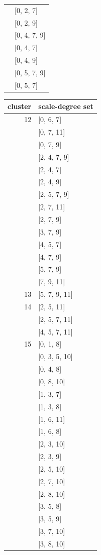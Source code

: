 \begin{table}
\begin{multicols}{3}
{\begin{tabular}[t]{r |l }
	&	[0, 2, 7]	\\
	&	[0, 2, 9]	\\
	&	[0, 4, 7, 9]	\\
	&	[0, 4, 7]	\\
	&	[0, 4, 9]	\\
	&	[0, 5, 7, 9]	\\
	&	[0, 5, 7]	\\
\end{tabular}
\vfill
\columnbreak
\begin{tabular}[t]{r |l }
\hline\hline
cluster & scale-degree set\\ [0.5ex]
\hline
12	&	[0, 6, 7]	\\
	&	[0, 7, 11]	\\
	&	[0, 7, 9]	\\
	&	[2, 4, 7, 9]	\\
	&	[2, 4, 7]	\\
	&	[2, 4, 9]	\\
	&	[2, 5, 7, 9]	\\
	&	[2, 7, 11]	\\
	&	[2, 7, 9]	\\
	&	[3, 7, 9]	\\
	&	[4, 5, 7]	\\
	&	[4, 7, 9]	\\
	&	[5, 7, 9]	\\
	&	[7, 9, 11]	\\
13	&	[5, 7, 9, 11]	\\
14	&	[2, 5, 11]	\\
	&	[2, 5, 7, 11]	\\
	&	[4, 5, 7, 11]	\\
15	&	[0, 1, 8]	\\
	&	[0, 3, 5, 10]	\\
	&	[0, 4, 8]	\\
	&	[0, 8, 10]	\\
	&	[1, 3, 7]	\\
	&	[1, 3, 8]	\\
	&	[1, 6, 11]	\\
	&	[1, 6, 8]	\\
	&	[2, 3, 10]	\\
	&	[2, 3, 9]	\\
	&	[2, 5, 10]	\\
	&	[2, 7, 10]	\\
	&	[2, 8, 10]	\\
	&	[3, 5, 8]	\\
	&	[3, 5, 9]	\\
	&	[3, 7, 10]	\\
	&	[3, 8, 10]	\\

\end{tabular}}
\end{multicols}
\end{table}
